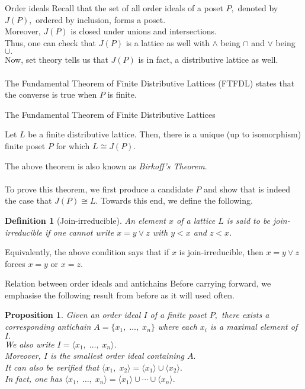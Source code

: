 \documentclass[handout, aspectratio=169]{beamer}
\newtheorem{defn}{Definition}
\newtheorem{prop}{Proposition}
\begin{document}
\begin{frame}{Order ideals}
	Recall that the set of all order ideals of a poset $P,$ denoted by $J(P),$ ordered by inclusion, forms a poset.\\
	Moreover, $J(P)$ is closed under unions and intersections.\\
	Thus, one can check that $J(P)$ is a lattice as well with $\wedge$ being $\cap$ and $\vee$ being $\cup.$\\
	Now, set theory tells us that $J(P)$ is in fact, a distributive lattice as well.\\~\\
	The Fundamental Theorem of Finite Distributive Lattices (FTFDL) states that the converse is true when $P$ is finite.
\end{frame}
\begin{frame}{The Fundamental Theorem of Finite Distributive Lattices}
	\begin{theorem}[FTFDL]
		Let $L$ be a finite distributive lattice. Then, there is a unique (up to isomorphism) finite poset $P$ for which $L \cong J(P).$
	\end{theorem}
	The above theorem is also known as \emph{Birkoff's Theorem}.\\~\\
	To prove this theorem, we first produce a candidate $P$ and show that is indeed the case that $J(P) \cong L.$ Towards this end, we define the following.
	\begin{defn}[Join-irreducible]
		An element $x$ of a lattice $L$ is said to be join-irreducible if one cannot write $x = y \vee z$ with $y < x$ and $z < x.$
	\end{defn}
	Equivalently, the above condition says that if $x$ is join-irreducible, then $x = y \vee z$ forces $x = y$ or $x = z.$
\end{frame}

\begin{frame}{Relation between order ideals and antichains}
	Before carrying forward, we emphasise the following result from before as it will used often.\\
	\begin{prop}\label{prop:ideal}
		Given an order ideal $I$ of a finite poset $P,$ there exists a corresponding antichain $A = \{x_1,\;\ldots,\;x_n\}$ where each $x_i$ is a maximal element of $I.$\\
		We also write $I = \langle x_1,\;\ldots,\;x_n\rangle.$\\
		Moreover, $I$ is the smallest order ideal containing $A.$\\
		It can also be verified that $\langle x_1,\;x_2\rangle = \langle x_1\rangle\cup\langle x_2\rangle.$\\
		In fact, one has $\langle x_1,\;\ldots,\;x_n\rangle = \langle x_1\rangle\cup\cdots\cup\langle x_n\rangle.$
	\end{prop}
\end{frame}
\end{document}
